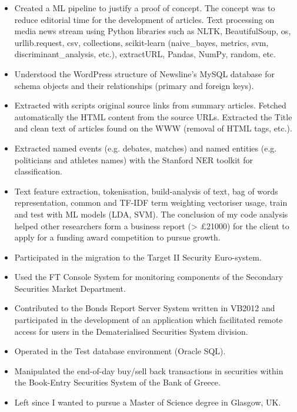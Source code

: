 {
{\begin{flushleft}
\begin{itemize}
    \item Created a ML pipeline to justify a proof of concept. The concept was to reduce editorial time for the development of articles. Text processing on media news stream using Python libraries such as NLTK, BeautifulSoup, os, urllib.request, csv, collections, scikit-learn (naive\_bayes, metrics, svm, discriminant\_analysis, etc.), extractURL, Pandas, NumPy, random, etc. 
    \item Understood the WordPress structure of Newsline's MySQL database for schema objects and their relationships (primary and foreign keys).
    \item Extracted with scripts original source links from summary articles. Fetched automatically the HTML content from the source URLs. Extracted the Title and clean text of articles found on the WWW (removal of HTML tags, etc.).
    \item Extracted named events (e.g. debates, matches) and named entities (e.g. politicians and athletes names) with the Stanford NER toolkit for classification. 
    \item Text feature extraction, tokenisation, build-analysis of text, bag of words representation, common and TF-IDF term weighting vectoriser usage, train and test with ML models (LDA, SVM). The conclusion of my code analysis helped other researchers form a business report (> £21000) for the client to apply for a funding award competition to pursue growth. 
\end{itemize}
\end{flushleft} } }

{
{\begin{flushleft}
\begin{itemize}
    \item Participated in the migration to the Target II Security Euro-system.
    \item Used the FT Console System for monitoring components of the Secondary Securities Market Department.
    \item Contributed to the Bonds Report Server System written in VB2012 and participated in the development of an application which facilitated remote access for users in the Dematerialised Securities System division.
    \item Operated in the Test database environment (Oracle SQL).
    \item Manipulated the end-of-day buy/sell back transactions in securities within the Book-Entry Securities System of the Bank of Greece.
    \item Left since I wanted to pursue a Master of Science degree in Glasgow, UK. 
\end{itemize}
\end{flushleft} } }
